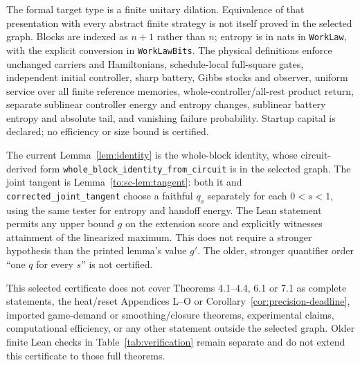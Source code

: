 The formal target type is a finite unitary dilation. Equivalence of that presentation with every abstract finite strategy is not itself proved in the selected graph. Blocks are indexed as $n+1$ rather than $n$; entropy is in nats in \texttt{WorkLaw}, with the explicit conversion in \texttt{WorkLawBits}. The physical definitions enforce unchanged carriers and Hamiltonians, schedule-local full-square gates, independent initial controller, sharp battery, Gibbs stocks and observer, uniform service over all finite reference memories, whole-controller/all-rest product return, separate sublinear controller energy and entropy changes, sublinear battery entropy and absolute tail, and vanishing failure probability. Startup capital is declared; no efficiency or size bound is certified.

The current Lemma~\ref{lem:identity} is the whole-block identity, whose circuit-derived form \texttt{whole\_\allowbreak{}block\_\allowbreak{}identity\_\allowbreak{}from\_\allowbreak{}circuit} is in the selected graph. The joint tangent is Lemma~\ref{to:sc-lem:tangent}: both it and \texttt{corrected\_\allowbreak{}joint\_\allowbreak{}tangent} choose a faithful $q_s$ separately for each $0<s<1$, using the same tester for entropy and handoff energy. The Lean statement permits any upper bound $g$ on the extension score and explicitly witnesses attainment of the linearized maximum. This does not require a stronger hypothesis than the printed lemma's value $g'$. The older, stronger quantifier order ``one $q$ for every $s$'' is not certified.

This selected certificate does not cover Theorems 4.1--4.4, 6.1 or 7.1 as complete statements, the heat/reset Appendices L--O or Corollary~\ref{cor:precision-deadline}, imported game-demand or smoothing/closure theorems, experimental claims, computational efficiency, or any other statement outside the selected graph. Older finite Lean checks in Table~\ref{tab:verification} remain separate and do not extend this certificate to those full theorems.
